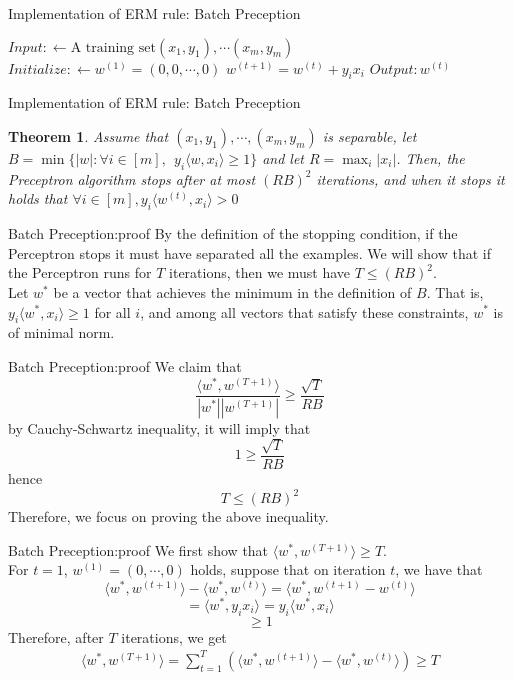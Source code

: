 \documentclass{beamer}
\newtheorem{thm}{Theorem}[subsection]
\begin{document}
\begin{frame}{Implementation of ERM rule: Batch Preception}
  \begin{algorithm}[H]
	  $Input: \gets \text{A training set} (x_1,y_1),\cdots (x_m,y_m)$\;
	  $Initialize: \gets w^{(1)} = (0,0,\cdots,0)$\;
	{
		$w^{(t+1)} = w^{(t)} + y_ix_i$\;
	}
	$Output: w^{(t)}$
  
  \caption{Batch Perceptron}
\end{algorithm}
\end{frame}
\begin{frame}{Implementation of ERM rule: Batch Preception}
\begin{thm}
	Assume that $(x_1,y_1), \cdots ,(x_m,y_m)$ is separable, let $B= \min \{|w|: \forall i \in [m], \ \ y_i \langle w,x_i \rangle \geq 1\}$ and let $R = \max_i |x_i|$. Then, the Preceptron algorithm stops after at most $(RB)^2$ iterations, and when it stops it holds that $\forall i \in [m], y_i \langle w^{(t)},x_i \rangle >0$
\end{thm}
\end{frame}
\begin{frame}{Batch Preception:proof}
	By the definition of the stopping condition, if the Perceptron stops it must have separated all the examples. We will show that if the Perceptron runs for $T$ iterations, then we must have $T \leq (RB)^2$.\\
	Let $w^*$ be a vector that achieves the minimum in the definition of $B$. That is,$y_i \langle w^*,x_i \rangle \geq 1$ for all $i$, and among all vectors that satisfy these constraints, $w^*$ is of minimal norm.
\end{frame}
\begin{frame}{Batch Preception:proof}
	We claim that
	\[\frac{\langle w^*, w^{(T+1)} \rangle}{|w^*| |w^{(T+1)}|} \geq \frac{\sqrt{T}}{RB}\]
	by Cauchy-Schwartz inequality, it will imply that  
	\[1 \geq  \frac{\sqrt{T}}{RB}\]	
	hence
	\[T \leq (RB)^2\]
	Therefore, we focus on proving the above inequality.

\end{frame}
\begin{frame}{Batch Preception:proof}
	We first show that $\langle w^*,w^{(T+1)} \rangle \geq T$. \\ 
	For $t=1$, $w^{(1)} = (0, \cdots,0)$ holds, suppose that on iteration $t$, we have that 
	\[\langle w^*,w^{(t+1)} \rangle - \langle w^*, w^{(t)} \rangle = \langle w^*,w^{(t+1)} - w^{(t)} \rangle\]
	\[= \langle w^*,y_ix_i \rangle = y_i \langle w^*,x_i \rangle\]
	\[\geq 1\]
	Therefore, after $T$ iterations, we get	
	\begin{align}
		\langle w^*,w^{(T+1)} \rangle = \sum^T_{t=1} (\langle w^*,w^{(t+1)} \rangle - \langle w^*,w^{(t)} \rangle) \geq T \label{eq:2}
\end{align}
\end{frame}
\end{document}
